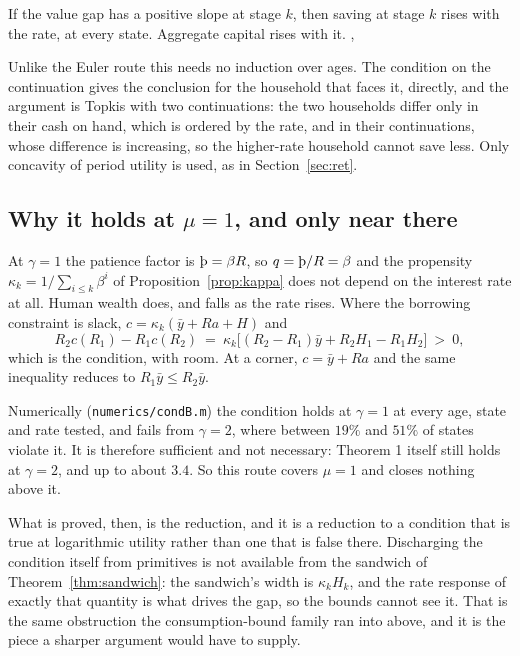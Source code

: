 \begin{theorem}\label{thm:gapmono}
If the value gap has a positive slope at stage $k$, then saving at stage $k$ rises with the rate,
at every state. Aggregate capital rises with it.
,
\end{theorem}

Unlike the Euler route this needs no induction over ages. The condition on the continuation gives
the conclusion for the household that faces it, directly, and the argument is Topkis with two
continuations: the two households differ only in their cash on hand, which is ordered by the rate,
and in their continuations, whose difference is increasing, so the higher-rate household cannot
save less. Only concavity of period utility is used, as in Section~\ref{sec:ret}.

\subsection{Why it holds at $\mu=1$, and only near there}

At $\gamma=1$ the patience factor is $\text{\th}=\beta R$, so $q=\text{\th}/R=\beta$ and the
propensity $\kappa_k=1/\sum_{i\le k}\beta^i$ of Proposition~\ref{prop:kappa} does not depend on
the interest rate at all. Human wealth does, and falls as the rate rises. Where the borrowing
constraint is slack, $c=\kappa_k(\bar y+Ra+H)$ and
\[
  R_2c(R_1)-R_1c(R_2)\ =\ \kappa_k\bigl[(R_2-R_1)\bar y+R_2H_1-R_1H_2\bigr]\ >\ 0 ,
\]
which is the condition, with room. At a corner, $c=\bar y+Ra$ and the same inequality reduces to
$R_1\bar y\le R_2\bar y$.

Numerically (\texttt{numerics/condB.m}) the condition holds at $\gamma=1$ at every age, state and
rate tested, and fails from $\gamma=2$, where between $19\%$ and $51\%$ of states violate it. It is
therefore sufficient and not necessary: Theorem 1 itself still holds at $\gamma=2$, and up to about
$3.4$. So this route covers $\mu=1$ and closes nothing above it.

What is proved, then, is the reduction, and it is a reduction to a condition that is true at
logarithmic utility rather than one that is false there. Discharging the condition itself from
primitives is not available from the sandwich of Theorem~\ref{thm:sandwich}: the sandwich's width
is $\kappa_kH_k$, and the rate response of exactly that quantity is what drives the gap, so the
bounds cannot see it. That is the same obstruction the consumption-bound family ran into above,
and it is the piece a sharper argument would have to supply.

